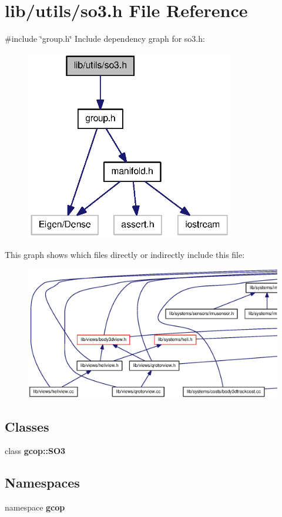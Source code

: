 \section{lib/utils/so3.h \-File \-Reference}
\label{so3_8h}
{\ttfamily \#include \char`\"{}group.\-h\char`\"{}}\*
\-Include dependency graph for so3.\-h\-:\nopagebreak
\begin{figure}[H]
\begin{center}
\leavevmode
\includegraphics[width=258pt]{so3_8h__incl}
\end{center}
\end{figure}
\-This graph shows which files directly or indirectly include this file\-:
\nopagebreak
\begin{figure}[H]
\begin{center}
\leavevmode
\includegraphics[width=350pt]{so3_8h__dep__incl}
\end{center}
\end{figure}
\subsection*{\-Classes}
\begin{DoxyCompactItemize}
\item 
class {\bf gcop\-::\-S\-O3}
\end{DoxyCompactItemize}
\subsection*{\-Namespaces}
\begin{DoxyCompactItemize}
\item 
namespace {\bf gcop}
\end{DoxyCompactItemize}

